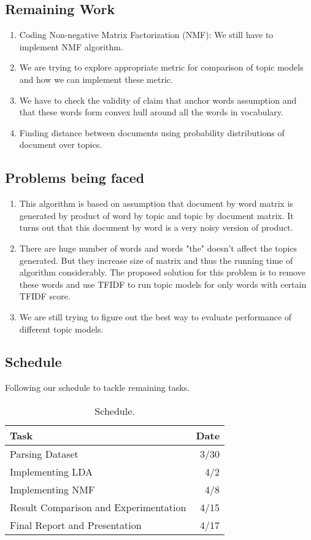 \documentclass[a4paper,11pt]{article}
\begin{document}
\subsection{Remaining Work}
\begin{enumerate}
\item Coding Non-negative Matrix Factorization (NMF): We still have to implement NMF algorithm.
\item We are trying to explore appropriate metric for comparison of topic models and how we can implement these metric.
\item We have to check the validity of claim that anchor words assumption and that these words form convex hull around all the words in vocabulary.
\item Finding distance between documents using probability distributions of document over topics.
\end{enumerate}


\subsection{Problems being faced}
\begin{enumerate}
\item This algorithm is based on assumption that document by word matrix is generated by product of word by topic and topic by document matrix. It turns out that this document by word is a very noisy version of product. 
\item There are huge number of words and words "the" doesn't affect the topics generated. But they increase size of matrix and thus the running time of algorithm considerably. The proposed solution for this problem is to remove these words and use TFIDF to run topic models for only words with certain TFIDF score.
\item We are still trying to figure out the best way to evaluate performance of different topic models. 
\end{enumerate}


\subsection{Schedule}
Following our schedule to tackle remaining tasks. 
\begin{table}
\centering
\begin{tabular}[htb]{l|r}
Task & Date\\\hline
Parsing Dataset & 3/30 \\
Implementing LDA & 4/2 \\
Implementing NMF & 4/8 \\
Result Comparison and Experimentation & 4/15 \\
Final Report and Presentation & 4/17
\end{tabular}
\caption{\label{tab:widgets}Schedule.}
\end{table}
\end{document}

